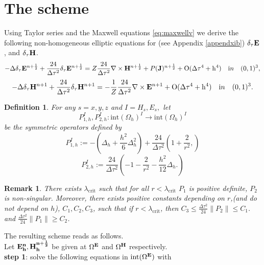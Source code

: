 \documentclass[12pt,reqno]{amsart}
\newcommand{\e}{{\bf E}}
\newcommand{\h}{{\bf H}}
\newcommand{\J}{{\bf J}}
\newtheorem{defi}[theorem]{Definition}
\newtheorem{rem}[theorem]{Remark}
\theoremstyle{definition}
\numberwithin{equation}{section}
\newcommand{\intr}[1]{\mathrm{int}(#1)}
\def\Gw{\Omega}     \def\Gx{\Xi}         \def\Gy{\Psi}
\def\Gwh{\Omega_h}
\begin{document}
	\section{The scheme}
	Using  Taylor series and the Maxwell equations \eqref{eq:maxwellv} we derive the following non-homogeneous elliptic equations for (see Appendix \ref{appendxib})
$	\delta_{\tau} \bf{E}$, and $\delta_{\tau} \bf{H}$.
	$$
	-\Delta\delta_{\tau} \e^{n+\frac{1}{2}}+\frac{24}{\Delta \tau^2}\delta_{\tau}\e^{n+\frac{1}{2}}=
	Z\frac{24}{\Delta \tau^2}\nabla\times \h^{n+\frac{1}{2}}+P(\J)^{n+\frac{1}{2}}+
	\mathrm{O(\Delta \tau^4+h^4)} \quad {\mathrm in} \quad (0,1)^3,
	$$
		$$
	-\Delta \delta_{\tau}\h^{n+1}+\frac{24}{\Delta \tau^2}\delta_{\tau}\h^{n+1}=
	-\frac{1}{Z}\frac{24}{\Delta \tau^2}\nabla\times \e^{n+1}+
	\mathrm{O(\Delta \tau^4+h^4)} \quad {\mathrm in} \quad (0,1)^3.
	$$
	\begin{defi}
		For any $s=x,y,z$ and $I= H_s, E_s,$
		let $$P_{1,h}^{I}, P_{2,h}^{I}:\intr\Gwh^{I}\to \intr\Gwh^{I}$$ be the symmetric operators defined by
		$$
		P_{1,h}^{I}:=-\left (\Delta_h+\frac{h^2}{6}\Delta_h^2\right)+\frac{24}{\Delta \tau^2}\left (
		 1+\frac{2}{r^2},
		\right)
		$$
		$$
			P_{2,h}^{I}:=\frac{24}{\Delta \tau^2}\left (
		-1-\frac{2}{r^2}-\frac{h^2}{12}\Delta_h.
		\right)
		$$	
		
		
	\end{defi}
\begin{rem}\label{lem:bottom_spectrum}
	There exists $\lambda_{\mathrm{crit}}$ such that for all $r<\lambda_{\mathrm{crit}}$
 $P_1$ is positive definite, $P_2$ is non-singular.
Moreover, there exists positive  constants depending on $r$,(and  do not depend on $h$), $C_1,C_2, C_3$, such that
if $r<\lambda_{\mathrm{crit}}$, then
$C_3\leq \frac{\Delta \tau^2 }{24}\|P_2\|\leq C_1$.
and 
$\frac{\Delta \tau^2 }{24}\|P_1\|\geq C_2$.
\end{rem}
	The resulting scheme reads as follows.\\[1mm]
	Let $\bf{E}^n_h, \bf{H}^{n+\frac{1}{2}}_h$  be given at $\Gw^{\e}$ and $\Gw^{\h}$ respectively. \\[2mm]
	{\bf step 1}: solve the following equations in $\intr{\Gw^{\e}}$ with
\end{document}
